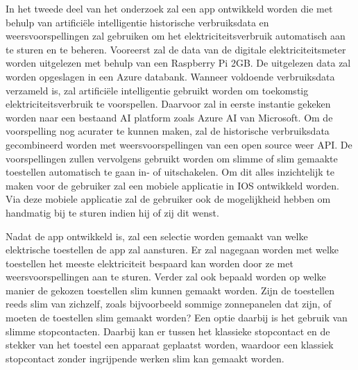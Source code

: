 \documentclass{hogent-article}
\begin{document}
In het tweede deel van het onderzoek zal een app ontwikkeld worden die met behulp van artificiële intelligentie historische verbruiksdata en weersvoorspellingen zal gebruiken om het elektriciteitsverbruik automatisch aan te sturen en te beheren. Vooreerst zal de data van de digitale elektriciteitsmeter worden uitgelezen met behulp van een Raspberry Pi 2GB. De uitgelezen data zal worden opgeslagen in een Azure databank. Wanneer voldoende verbruiksdata verzameld is, zal artificiële intelligentie gebruikt worden om toekomstig elektriciteitsverbruik te voorspellen. Daarvoor zal in eerste instantie gekeken worden naar een bestaand AI platform zoals Azure AI van Microsoft. Om de voorspelling nog acurater te kunnen maken, zal de historische verbruiksdata gecombineerd worden met weersvoorspellingen van een open source weer API. De voorspellingen zullen vervolgens gebruikt worden om slimme of slim gemaakte toestellen automatisch te gaan in- of uitschakelen. Om dit alles inzichtelijk te maken voor de gebruiker zal een mobiele applicatie in IOS ontwikkeld worden. Via deze mobiele applicatie zal de gebruiker ook de mogelijkheid hebben om handmatig bij te sturen indien hij of zij dit wenst.

Nadat de app ontwikkeld is, zal een selectie worden gemaakt van welke elektrische toestellen de app zal aansturen. Er zal nagegaan worden met welke toestellen het meeste elektriciteit bespaard kan worden door ze met weersvoorspellingen aan te sturen. Verder zal ook bepaald worden op welke manier de gekozen toestellen slim kunnen gemaakt worden. Zijn de toestellen reeds slim van zichzelf, zoals bijvoorbeeld sommige zonnepanelen dat zijn, of moeten de toestellen slim gemaakt worden? Een optie daarbij is het gebruik van slimme stopcontacten. Daarbij kan er tussen het klassieke stopcontact en de stekker van het toestel een apparaat geplaatst worden, waardoor een klassiek stopcontact zonder ingrijpende werken slim kan gemaakt worden.

\end{document}
